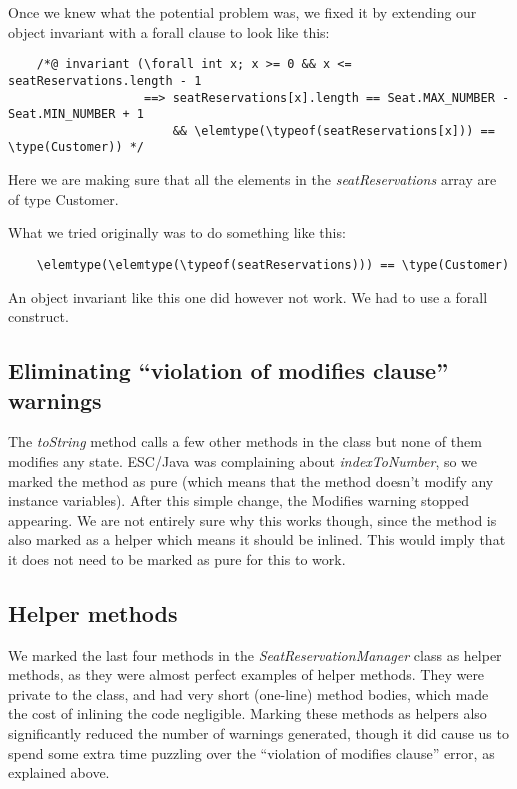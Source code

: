 \documentclass{article}
\begin{document}
{Once we knew what the potential problem was, we fixed it by extending our object invariant with a forall clause to look like this:

\begin{verbatim}
    /*@ invariant (\forall int x; x >= 0 && x <= seatReservations.length - 1
                   ==> seatReservations[x].length == Seat.MAX_NUMBER - Seat.MIN_NUMBER + 1
                       && \elemtype(\typeof(seatReservations[x])) == \type(Customer)) */
\end{verbatim}

Here we are making sure that all the elements in the \emph{seatReservations} array are of type Customer.

What we tried originally was to do something like this:

\begin{verbatim}
    \elemtype(\elemtype(\typeof(seatReservations))) == \type(Customer)
\end{verbatim}

An object invariant like this one did however not work. We had to use a forall construct.

\subsection{Eliminating ``violation of modifies clause'' warnings}

The \emph{toString} method calls a few other methods in the class but none of them modifies any state. ESC/Java was complaining about \emph{indexToNumber}, so we marked the method as pure (which means that the method doesn't modify any instance variables). After this simple change, the Modifies warning stopped appearing. We are not entirely sure why this works though, since the method is also marked as a helper which means it should be inlined. This would imply that it does not need to be marked as pure for this to work.

\subsection{Helper methods}

We marked the last four methods in the \emph{SeatReservationManager} class as helper methods, as they were almost perfect examples of helper methods. They were private to the class, and had very short (one-line) method bodies, which made the cost of inlining the code negligible. Marking these methods as helpers also significantly reduced the number of warnings generated, though it did cause us to spend some extra time puzzling over the ``violation of modifies clause'' error, as explained above.

}
\end{document}
